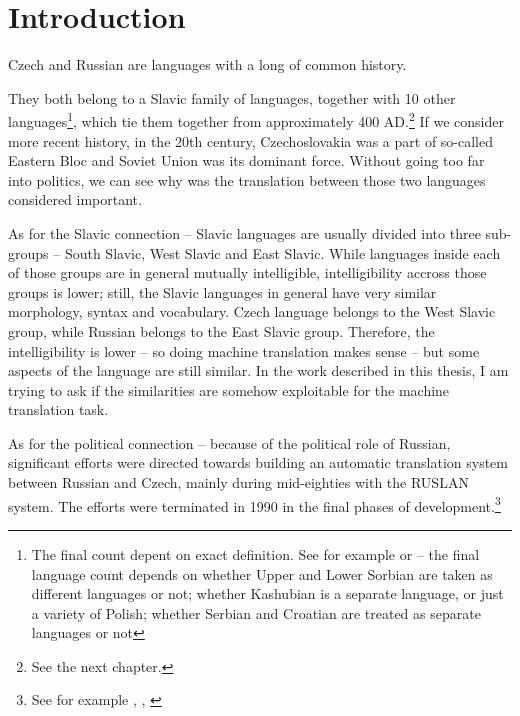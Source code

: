 \chapter*{Introduction}

Czech and Russian are languages with a long of common history.

They both belong to a Slavic family of languages, together with 10 other languages\footnote{The final count depent on exact definition. See for example \cite{sussex2011slavic} or \cite{siewierska1998overview} --  the final language count depends on whether Upper and Lower Sorbian are taken as different languages or not; whether Kashubian is a separate language, or just a variety of Polish; whether Serbian and Croatian are treated as separate languages or not},
which tie them together from approximately 400 AD.\footnote{See the next chapter.}
If we consider more recent history, in the 20th century, Czechoslovakia was a part of so-called Eastern Bloc and Soviet Union was its dominant force. Without going too far into politics, we can see why was the translation between those two languages considered important.

As for the Slavic connection -- Slavic languages are usually divided into three sub-groups -- South Slavic, West Slavic and East Slavic. While languages inside each of those groups are in general mutually intelligible, intelligibility accross those groups is lower; still, the Slavic languages in general have very similar morphology, syntax and vocabulary. Czech language belongs to the West Slavic group, while Russian belongs to the East Slavic group. Therefore, the intelligibility is lower -- so doing machine translation makes sense -- but some aspects of the language are still similar. In the work described in this thesis, I am trying to ask if the similarities are somehow exploitable for the machine translation task.


As for the political connection -- because of the 
political role of Russian,
 significant efforts were directed towards building an automatic translation system between Russian and Czech, mainly during mid-eighties with the RUSLAN system. The efforts were terminated in 1990 in the final phases of development.\footnote{See for example \cite{recycled}, \cite{hajic1987}, \cite{olivaruslan}} 

